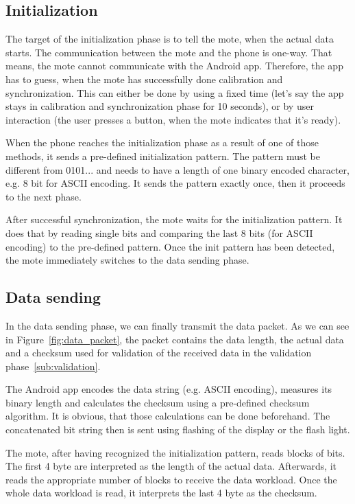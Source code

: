 \documentclass{sig-alternate} %
\begin{document}
\subsection{Initialization}
\label{sub:initialization}

The target of the initialization phase is to tell the mote, when the actual data starts.
The communication between the mote and the phone is one-way.
That means, the mote cannot communicate with the Android app.
Therefore, the app has to guess, when the mote has successfully done calibration and synchronization.
This can either be done by using a fixed time (let's say the app stays in calibration and synchronization phase for 10 seconds), or by user interaction (the user presses a button, when the mote indicates that it's ready).

When the phone reaches the initialization phase as a result of one of those methods, it sends a pre-defined initialization pattern.
The pattern must be different from 0101... and needs to have a length of one binary encoded character, e.g. 8 bit for ASCII encoding.
It sends the pattern exactly once, then it proceeds to the next phase.

After successful synchronization, the mote waits for the initialization pattern.
It does that by reading single bits and comparing the last 8 bits (for ASCII encoding) to the pre-defined pattern.
Once the init pattern has been detected, the mote immediately switches to the data sending phase.

\subsection{Data sending}
\label{sub:data_sending}

In the data sending phase, we can finally transmit the data packet.
As we can see in Figure~\ref{fig:data_packet}, the packet contains the data length, the actual data and a checksum used for validation of the received data in the validation phase~\ref{sub:validation}.

The Android app encodes the data string (e.g. ASCII encoding), measures its binary length and calculates the checksum using a pre-defined checksum algorithm.
It is obvious, that those calculations can be done beforehand.
The concatenated bit string then is sent using flashing of the display or the flash light.

The mote, after having recognized the initialization pattern, reads blocks of bits.
The first 4 byte are interpreted as the length of the actual data.
Afterwards, it reads the appropriate number of blocks to receive the data workload.
Once the whole data workload is read, it interprets the last 4 byte as the checksum.
\end{document}

